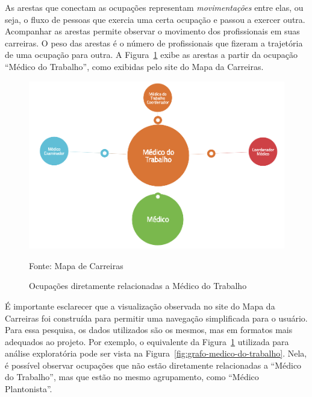 \documentclass[12pt,a4paper]{article}
\newcommand{\source}[1]{\vspace{-10pt} \caption*{Fonte: {#1}} }
\begin{document}

As arestas que conectam as ocupações representam \textit{movimentações} entre elas, ou seja, o fluxo de pessoas que exercia uma certa ocupação e passou a exercer outra. Acompanhar as arestas permite observar o movimento dos profissionais em suas carreiras. O peso das arestas é o número de profissionais que fizeram a trajetória de uma ocupação para outra. A Figura~\ref{fig:exemplo-medico-do-trabalho} exibe as arestas a partir da ocupação \enquote{Médico do Trabalho}, como exibidas pelo site do Mapa da Carreiras.

\begin{figure}[ht]
  \centering
  \includegraphics[scale=0.25]{mapa-medico-do-trabalho.png}
  \caption{Ocupações diretamente relacionadas a Médico do Trabalho}
  \source{Mapa de Carreiras}
  \label{fig:exemplo-medico-do-trabalho}
\end{figure}


É importante esclarecer que a visualização observada no site do Mapa da Carreiras foi construída para permitir uma navegação simplificada para o usuário. Para essa pesquisa, os dados utilizados são os mesmos, mas em formatos mais adequados ao projeto. Por exemplo, o equivalente da Figura~\ref{fig:exemplo-medico-do-trabalho} utilizada para análise exploratória pode ser vista na Figura~\ref{fig:grafo-medico-do-trabalho}. Nela, é possível observar ocupações que não estão diretamente relacionadas a \enquote{Médico do Trabalho}, mas que estão no mesmo agrupamento, como \enquote{Médico Plantonista}.
\end{document}
